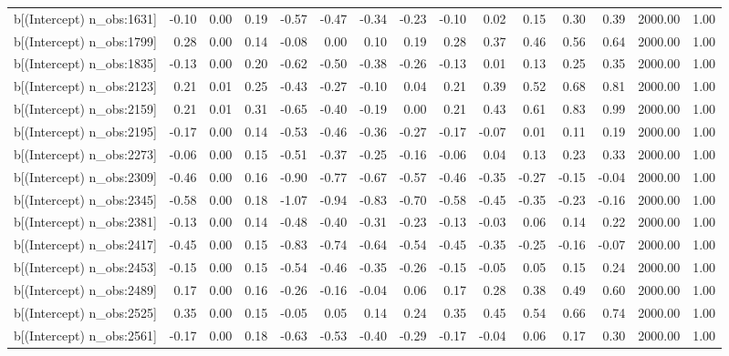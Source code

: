 \begin{table}[ht]
\begin{tabular}{rrrrrrrrrrrrrrr}
  b[(Intercept) n\_obs:1631] & -0.10 & 0.00 & 0.19 & -0.57 & -0.47 & -0.34 & -0.23 & -0.10 & 0.02 & 0.15 & 0.30 & 0.39 & 2000.00 & 1.00 \\ 
  b[(Intercept) n\_obs:1799] & 0.28 & 0.00 & 0.14 & -0.08 & 0.00 & 0.10 & 0.19 & 0.28 & 0.37 & 0.46 & 0.56 & 0.64 & 2000.00 & 1.00 \\ 
  b[(Intercept) n\_obs:1835] & -0.13 & 0.00 & 0.20 & -0.62 & -0.50 & -0.38 & -0.26 & -0.13 & 0.01 & 0.13 & 0.25 & 0.35 & 2000.00 & 1.00 \\ 
  b[(Intercept) n\_obs:2123] & 0.21 & 0.01 & 0.25 & -0.43 & -0.27 & -0.10 & 0.04 & 0.21 & 0.39 & 0.52 & 0.68 & 0.81 & 2000.00 & 1.00 \\ 
  b[(Intercept) n\_obs:2159] & 0.21 & 0.01 & 0.31 & -0.65 & -0.40 & -0.19 & 0.00 & 0.21 & 0.43 & 0.61 & 0.83 & 0.99 & 2000.00 & 1.00 \\ 
  b[(Intercept) n\_obs:2195] & -0.17 & 0.00 & 0.14 & -0.53 & -0.46 & -0.36 & -0.27 & -0.17 & -0.07 & 0.01 & 0.11 & 0.19 & 2000.00 & 1.00 \\ 
  b[(Intercept) n\_obs:2273] & -0.06 & 0.00 & 0.15 & -0.51 & -0.37 & -0.25 & -0.16 & -0.06 & 0.04 & 0.13 & 0.23 & 0.33 & 2000.00 & 1.00 \\ 
  b[(Intercept) n\_obs:2309] & -0.46 & 0.00 & 0.16 & -0.90 & -0.77 & -0.67 & -0.57 & -0.46 & -0.35 & -0.27 & -0.15 & -0.04 & 2000.00 & 1.00 \\ 
  b[(Intercept) n\_obs:2345] & -0.58 & 0.00 & 0.18 & -1.07 & -0.94 & -0.83 & -0.70 & -0.58 & -0.45 & -0.35 & -0.23 & -0.16 & 2000.00 & 1.00 \\ 
  b[(Intercept) n\_obs:2381] & -0.13 & 0.00 & 0.14 & -0.48 & -0.40 & -0.31 & -0.23 & -0.13 & -0.03 & 0.06 & 0.14 & 0.22 & 2000.00 & 1.00 \\ 
  b[(Intercept) n\_obs:2417] & -0.45 & 0.00 & 0.15 & -0.83 & -0.74 & -0.64 & -0.54 & -0.45 & -0.35 & -0.25 & -0.16 & -0.07 & 2000.00 & 1.00 \\ 
  b[(Intercept) n\_obs:2453] & -0.15 & 0.00 & 0.15 & -0.54 & -0.46 & -0.35 & -0.26 & -0.15 & -0.05 & 0.05 & 0.15 & 0.24 & 2000.00 & 1.00 \\ 
  b[(Intercept) n\_obs:2489] & 0.17 & 0.00 & 0.16 & -0.26 & -0.16 & -0.04 & 0.06 & 0.17 & 0.28 & 0.38 & 0.49 & 0.60 & 2000.00 & 1.00 \\ 
  b[(Intercept) n\_obs:2525] & 0.35 & 0.00 & 0.15 & -0.05 & 0.05 & 0.14 & 0.24 & 0.35 & 0.45 & 0.54 & 0.66 & 0.74 & 2000.00 & 1.00 \\ 
  b[(Intercept) n\_obs:2561] & -0.17 & 0.00 & 0.18 & -0.63 & -0.53 & -0.40 & -0.29 & -0.17 & -0.04 & 0.06 & 0.17 & 0.30 & 2000.00 & 1.00 \\ 

\end{tabular}
\end{table}
